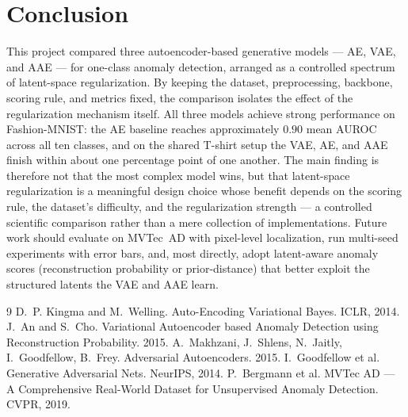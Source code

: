 \documentclass[11pt]{article}
\begin{document}
\section{Conclusion}   %
This project compared three autoencoder-based generative models --- AE, VAE, and
AAE --- for one-class anomaly detection, arranged as a controlled spectrum of
latent-space regularization. By keeping the dataset, preprocessing, backbone,
scoring rule, and metrics fixed, the comparison isolates the effect of the
regularization mechanism itself. All three models achieve strong performance on
Fashion-MNIST: the AE baseline reaches approximately $0.90$ mean AUROC across all
ten classes, and on the shared T-shirt setup the VAE, AE, and AAE finish within
about one percentage point of one another. The main finding is therefore not that
the most complex model wins, but that latent-space regularization is a meaningful
design choice whose benefit depends on the scoring rule, the dataset's difficulty,
and the regularization strength --- a controlled scientific comparison rather than
a mere collection of implementations. Future work should evaluate on MVTec~AD with
pixel-level localization, run multi-seed experiments with error bars, and, most
directly, adopt latent-aware anomaly scores (reconstruction probability or
prior-distance) that better exploit the structured latents the VAE and AAE learn.

\begin{thebibliography}{9}
 D.~P. Kingma and M.~Welling. Auto-Encoding Variational Bayes. ICLR, 2014.
 J.~An and S.~Cho. Variational Autoencoder based Anomaly Detection using Reconstruction Probability. 2015.
 A.~Makhzani, J.~Shlens, N.~Jaitly, I.~Goodfellow, B.~Frey. Adversarial Autoencoders. 2015.
 I.~Goodfellow et al. Generative Adversarial Nets. NeurIPS, 2014.
 P.~Bergmann et al. MVTec AD --- A Comprehensive Real-World Dataset for Unsupervised Anomaly Detection. CVPR, 2019.
\end{thebibliography}
\end{document}

